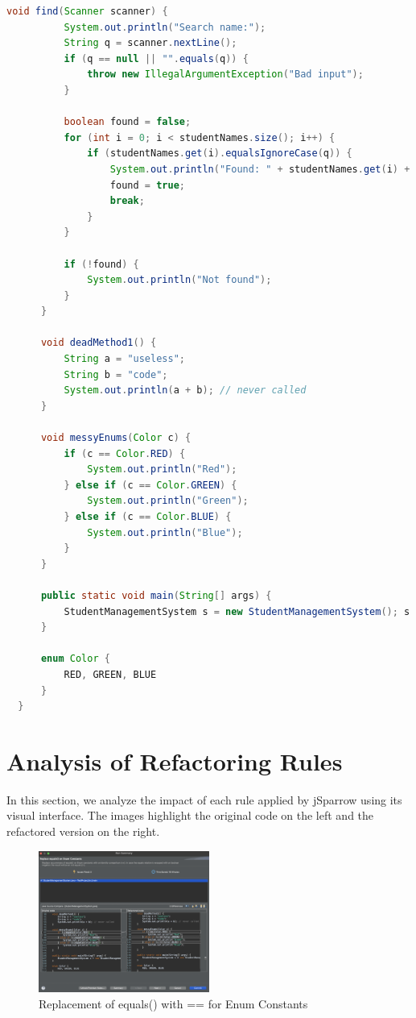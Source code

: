 \documentclass[a4paper,12pt]{article}
\begin{document}
\begin{lstlisting}[language=Java, caption={Refactored Code Generated by jSparrow}, label={lst:jsparrow-result}]
      void find(Scanner scanner) {
          System.out.println("Search name:");
          String q = scanner.nextLine();
          if (q == null || "".equals(q)) {
              throw new IllegalArgumentException("Bad input");
          }
  
          boolean found = false;
          for (int i = 0; i < studentNames.size(); i++) {
              if (studentNames.get(i).equalsIgnoreCase(q)) {
                  System.out.println("Found: " + studentNames.get(i) + ", ID: " + studentIds.get(i));
                  found = true;
                  break;
              }
          }
  
          if (!found) {
              System.out.println("Not found");
          }
      }
  
      void deadMethod1() {
          String a = "useless";
          String b = "code";
          System.out.println(a + b); // never called
      }
  
      void messyEnums(Color c) {
          if (c == Color.RED) {
              System.out.println("Red");
          } else if (c == Color.GREEN) {
              System.out.println("Green");
          } else if (c == Color.BLUE) {
              System.out.println("Blue");
          }
      }
  
      public static void main(String[] args) {
          StudentManagementSystem s = new StudentManagementSystem(); s.menu();
      }
  
      enum Color {
          RED, GREEN, BLUE
      }
  }  
\end{lstlisting}

\section{Analysis of Refactoring Rules}

In this section, we analyze the impact of each rule applied by jSparrow using its visual interface. The images highlight the original code on the left and the refactored version on the right.

\begin{figure}[H]
  \centering
  \includegraphics[width=0.5\textwidth]{issue-1-3.png}
  \caption{Replacement of equals() with == for Enum Constants}
  \label{fig:issue-1-3}
\end{figure}
\end{document}
